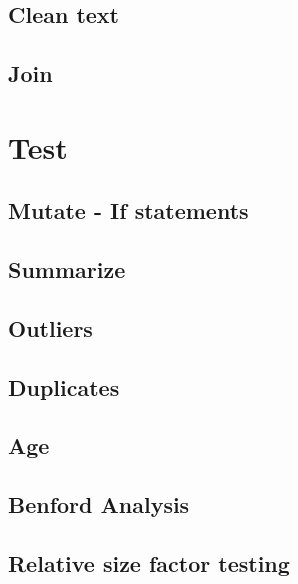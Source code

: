 \documentclass[
]{book}
\begin{document}
\hypertarget{clean-text}{%
\section{Clean text}\label{clean-text}}

\hypertarget{join}{%
\section{Join}\label{join}}

\hypertarget{test}{%
\chapter{Test}\label{test}}

\hypertarget{mutate---if-statements}{%
\section{Mutate - If statements}\label{mutate---if-statements}}

\hypertarget{summarize}{%
\section{Summarize}\label{summarize}}

\hypertarget{outliers}{%
\section{Outliers}\label{outliers}}

\hypertarget{duplicates}{%
\section{Duplicates}\label{duplicates}}

\hypertarget{age}{%
\section{Age}\label{age}}

\hypertarget{benford-analysis}{%
\section{Benford Analysis}\label{benford-analysis}}

\hypertarget{relative-size-factor-testing}{%
\section{Relative size factor testing}\label{relative-size-factor-testing}}
\end{document}
